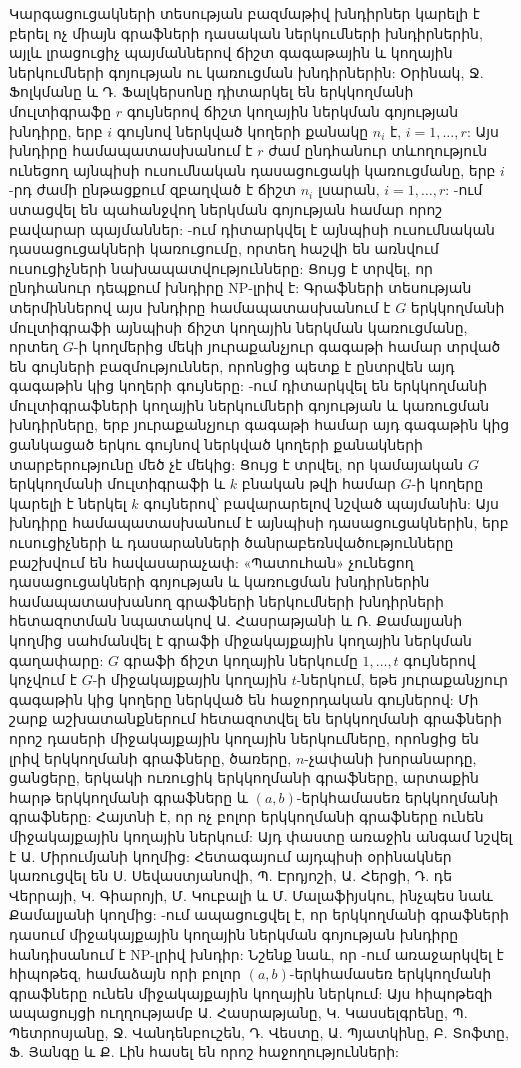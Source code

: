 Կարգացուցակների տեսության բազմաթիվ խնդիրներ կարելի է բերել ոչ միայն գրաֆների դասական ներկումների խնդիրներին, այլև լրացուցիչ պայմաններով ճիշտ գագաթային և կողային ներկումների գոյության ու կառուցման խնդիրներին: Օրինակ, Ջ. Ֆոլկմանը և Դ. Ֆալկերսոնը \cite{FolkmanFulkerson} դիտարկել են երկկողմանի մուլտիգրաֆը $r$ գույներով ճիշտ կողային ներկման գոյության խնդիրը, երբ $i$ գույնով ներկված կողերի քանակը $n_i$ է, $i=1,\ldots,r$: Այս խնդիրը համապատասխանում է $r$ ժամ ընդհանուր տևողություն ունեցող այնպիսի ուսումնական դասացուցակի կառուցմանը, երբ $i$-րդ ժամի ընթացքում զբաղված է ճիշտ $n_i$ լսարան, $i=1,\ldots,r$: \cite{Asratian2000,DeWerra1971,DulmageMendelsohn}-ում ստացվել են պահանջվող ներկման գոյության համար որոշ բավարար պայմաններ: \cite{EvenItaiShamir}-ում դիտարկվել է այնպիսի ուսումնական դասացուցակների կառուցումը, որտեղ հաշվի են առնվում ուսուցիչների նախապատվությունները: Ցույց է տրվել, որ ընդհանուր դեպքում խնդիրը NP-լրիվ է: Գրաֆների տեսության տերմիններով այս խնդիրը համապատասխանում է $G$ երկկողմանի մուլտիգրաֆի այնպիսի ճիշտ կողային ներկման կառուցմանը, որտեղ $G$-ի կողմերից մեկի յուրաքանչյուր գագաթի համար տրված են գույների բազմություններ, որոնցից պետք է ընտրվեն այդ գագաթին կից կողերի գույները: \cite{DeWerra1971Balanced}-ում դիտարկվել են երկկողմանի մուլտիգրաֆների կողային ներկումների գոյության և կառուցման խնդիրները, երբ յուրաքանչյուր գագաթի համար այդ գագաթին կից ցանկացած երկու գույնով ներկված կողերի քանակների տարբերությունը մեծ չէ մեկից: Ցույց է տրվել, որ կամայական $G$ երկկողմանի մուլտիգրաֆի և $k$ բնական թվի համար $G$-ի կողերը կարելի է ներկել $k$ գույներով՝ բավարարելով նշված պայմանին: Այս խնդիրը համապատասխանում է այնպիսի դասացուցակներին, երբ ուսուցիչների և դասարանների ծանրաբեռնվածությունները բաշխվում են հավասարաչափ: «Պատուհան» չունեցող դասացուցակների գոյության և կառուցման խնդիրներին համապատասխանող գրաֆների ներկումների խնդիրների հետազոտման նպատակով Ա. Հասրաթյանի և Ռ. Քամալյանի կողմից սահմանվել է գրաֆի միջակայքային կողային ներկման \cite{AsratianKamalian1987} գաղափարը: $G$ գրաֆի ճիշտ կողային ներկումը $1,\ldots,t$ գույներով կոչվում է $G$-ի միջակայքային կողային $t$-ներկում, եթե յուրաքանչյուր գագաթին կից կողերը ներկված են հաջորդական գույներով: Մի շարք աշխատանքներում հետազոտվել են երկկողմանի գրաֆների որոշ դասերի միջակայքային կողային ներկումները, որոնցից են լրիվ երկկողմանի գրաֆները, ծառերը, $n$-չափանի խորանարդը, ցանցերը, երկակի ուռուցիկ երկկողմանի գրաֆները, արտաքին հարթ երկկողմանի գրաֆները և $(a,b)$-երկհամասեռ երկկողմանի գրաֆները: Հայտնի է, որ ոչ բոլոր երկկողմանի գրաֆները ունեն միջակայքային կողային ներկում: Այդ փաստը առաջին անգամ նշվել է Ա. Միրումյանի կողմից: Հետագայում այդպիսի օրինակներ կառուցվել են Ս. Սեվաստյանովի, Պ. Էրդյոշի, Ա. Հերցի, Դ. դե Վերրայի, Կ. Գիարոյի, Մ. Կուբալի և Մ. Մալաֆիյսկու, ինչպես նաև Քամալյանի կողմից: \cite{Sevastyanov1990}-ում ապացուցվել է, որ երկկողմանի գրաֆների դասում միջակայքային կողային ներկման գոյության խնդիրը հանդիսանում է NP-լրիվ խնդիր: Նշենք նաև, որ \cite{JensenToft1995}-ում առաջարկվել է հիպոթեզ, համաձայն որի բոլոր $(a,b)$-երկհամասեռ երկկողմանի գրաֆները ունեն միջակայքային կողային ներկում: Այս հիպոթեզի ապացույցի ուղղությամբ Ա. Հասրաթյանը, Կ. Կասսելգրենը, Պ. Պետրոսյանը, Ջ. Վանդենբուշեն, Դ. Վեստը, Ա. Պյատկինը, Բ. Տոֆտը, Ֆ. Յանգը և Ք. Լին հասել են որոշ հաջողությունների:

